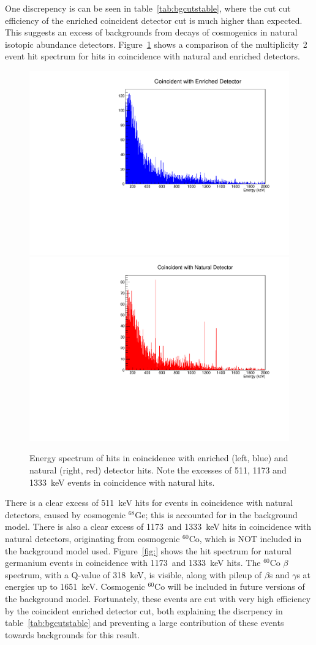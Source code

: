 \documentclass[notitlepage,rmp,aps,10pt]{revtex4-1}
\begin{document}
One discrepency is can be seen in table~\ref{tab:bgcutstable}, where the cut cut efficiency of the enriched coincident detector cut is much higher than expected.
This suggests an excess of backgrounds from decays of cosmogenics in natural isotopic abundance detectors.
Figure~\ref{fig:coincnatenr} shows a comparison of the multiplicity~2 event hit spectrum for hits in coincidence with natural and enriched detectors.
\begin{figure}[h]
  \centering
  \includegraphics[width=.4\linewidth]{coinc_enr}
  \includegraphics[width=.4\linewidth]{coinc_nat}
  \caption[Measured events after all cuts with ROIs drawn]{\label{fig:coincnatenr}
    Energy spectrum of hits in coincidence with enriched (left, blue) and natural (right, red) detector hits. Note the excesses of 511, 1173 and 1333~keV events in coincidence with natural hits.
  }
\end{figure}
There is a clear excess of 511~keV hits for events in coincidence with natural detectors, caused by cosmogenic $^{68}$Ge; this is accounted for in the background model.
There is also a clear excess of 1173~and 1333~keV hits in coincidence with natural detectors, originating from cosmogenic $^{60}$Co, which is NOT included in the background model used.
Figure~\ref{fig:} shows the hit spectrum for natural germanium events in coincidence with 1173~and 1333~keV hits.
The $^{60}$Co $\beta$ spectrum, with a Q-value of 318~keV, is visible, along with pileup of $\beta$s and $\gamma$s at energies up to 1651~keV.
Cosmogenic $^{60}$Co will be included in future versions of the background model.
Fortunately, these events are cut with very high efficiency by the coincident enriched detector cut, both explaining the discrpency in table~\ref{tab:bgcutstable} and preventing a large contribution of these events towards backgrounds for this result.
\end{document}
